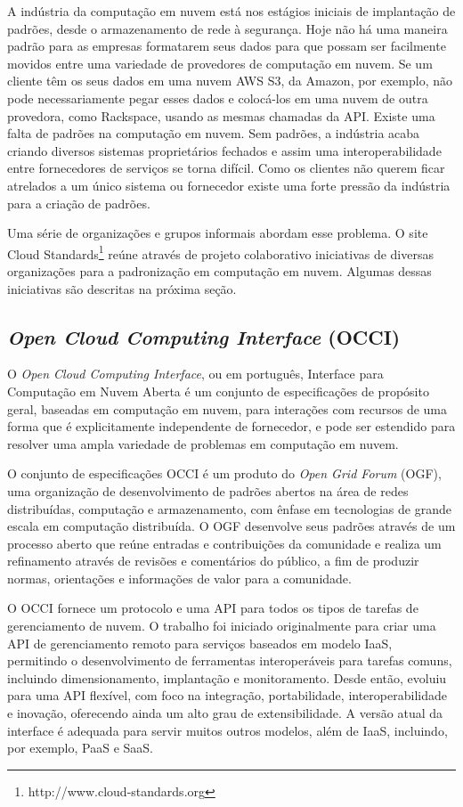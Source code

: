 A indústria da computação em nuvem está nos estágios iniciais de implantação de
padrões, desde o armazenamento de rede à segurança. Hoje não há uma maneira
padrão para as empresas formatarem seus dados para que possam ser facilmente
movidos entre uma variedade de provedores de computação em nuvem. Se um cliente
têm os seus dados em uma nuvem AWS S3, da Amazon, por exemplo, não pode
necessariamente pegar esses dados e colocá-los em uma nuvem de outra provedora,
como Rackspace, usando as mesmas chamadas da API. Existe uma falta de padrões na
computação em nuvem. Sem padrões, a indústria acaba criando diversos sistemas
proprietários fechados e assim uma interoperabilidade entre fornecedores de
serviços se torna difícil. Como os clientes não querem ficar atrelados a um
único sistema ou fornecedor existe uma forte pressão da indústria para a criação
de padrões.

Uma série de organizações e grupos informais abordam esse problema. O site Cloud
Standards\footnote{http://www.cloud-standards.org} reúne através de projeto
colaborativo iniciativas de diversas organizações para a padronização em
computação em nuvem. Algumas dessas iniciativas são descritas na próxima seção.

\subsection{\textit{Open Cloud Computing Interface} (OCCI)}
\label{computacaoemnuvem:padronizacoes:occi}

O \textit{Open Cloud Computing Interface}, ou em português, Interface para
Computação em Nuvem Aberta é um conjunto de especificações de propósito geral,
baseadas em computação em nuvem, para interações com recursos de uma forma que é
explicitamente independente de fornecedor, e pode ser estendido para resolver uma ampla variedade de problemas em computação em nuvem.

O conjunto de especificações OCCI é um produto do \textit{Open Grid Forum}
(OGF), uma organização de desenvolvimento de padrões abertos na área de redes
distribuídas, computação e armazenamento, com ênfase em tecnologias de grande
escala em computação distribuída. O OGF desenvolve seus padrões através de um
processo aberto que reúne entradas e contribuições da comunidade e realiza um
refinamento através de revisões e comentários do público, a fim de produzir
normas, orientações e informações de valor para a comunidade.

O OCCI fornece um protocolo e uma API para todos os tipos de tarefas de
gerenciamento de nuvem. O trabalho foi iniciado originalmente para criar uma API
de gerenciamento remoto para serviços baseados em modelo IaaS, permitindo o
desenvolvimento de ferramentas interoperáveis para tarefas comuns, incluindo
dimensionamento, implantação e monitoramento. Desde então, evoluiu para uma API
flexível, com foco na integração, portabilidade, interoperabilidade e inovação,
oferecendo ainda um alto grau de extensibilidade. A versão atual da interface é
adequada para servir muitos outros modelos, além de IaaS, incluindo, por
exemplo, PaaS e SaaS.

